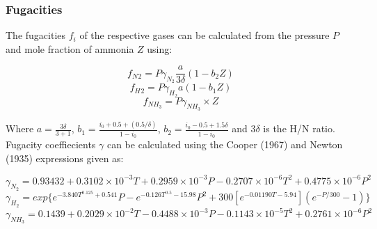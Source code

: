 \documentclass[11pt, a4paper]{article}
\begin{document}
{\subsubsection{Fugacities}
The fugacities $f_i$ of the respective gases can be calculated from the pressure $P$ and mole fraction of ammonia $Z$ using:

{\singlespacing
\begin{equation}
f_N{_2}= P\gamma_{N_2}\frac{a}{3\delta}(1-b_2Z)
\end{equation}
\begin{equation}
f_H{_2}=P\gamma_{H_2}a(1-b_1Z) 
\end{equation}
\begin{equation}
f_{NH{_3}}=P\gamma_{NH_3}\times Z 
\end{equation}}


Where $a= \frac{3\delta}{3+ 1}$,   $ b_1 = \frac{i_0 +0.5 + (0.5/\delta)}{1-i_0}$, $ b_2 = \frac{i_0 - 0.5 +1.5\delta}{1-i_0}$ and $3\delta$ is the H/N ratio.
Fugacity coeffiecients $\gamma$ can be calculated using the Cooper (1967) and Newton (1935) expressions given as:

	{\singlespacing 
\begin{equation} \gamma_{N_2} = 0.93432 + 0.3102\times10^{-3}T+0.2959\times10^{-3}P-0.2707\times10^{-6}T^2+0.4775\times10^{-6}  P^2
\end{equation}
\begin{equation} 
\gamma_{H_2} = exp\{ e^{-3.840T^{0.125}+0.541}P-e^{-0.126T^{0.5}-15.98}P^2+300[e^{-0.01190T-5.94}](e^{-P/300}-1)\}
\end{equation}
\begin{equation} 
\gamma_{NH_3} =0.1439 + 0.2029\times10^{-2}T - 0.4488\times10^{-3}P - 0.1143\times10^{-5}T^2 + 0.2761\times10^{-6}P^2
\end{equation} }
\begin{figure}
		\centering
		

\end{figure}}
\end{document}
